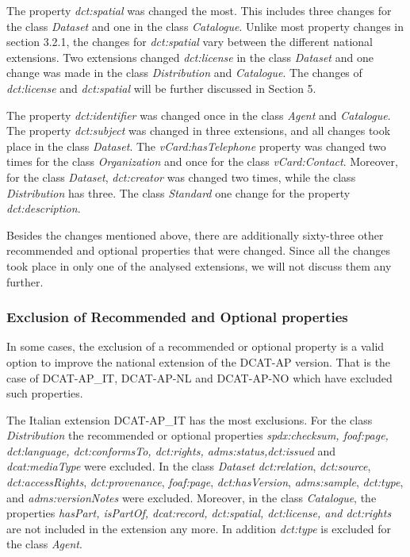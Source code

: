 \documentclass[<options>]{elsarticle}
\begin{document}
The property \textit{dct:spatial} was changed the most. This includes three changes for the class \textit{Dataset} and one in the class \textit{Catalogue}. Unlike most property changes in section 3.2.1, the changes for \textit{dct:spatial} vary between the different national extensions. Two extensions changed \textit{dct:license} in the class \textit{Dataset} and one change was made in the class \textit{Distribution} and \textit{Catalogue}. The changes of \textit{dct:license} and \textit{dct:spatial} will be  further discussed in Section 5. 

The property \textit{dct:identifier} was changed once in the class \textit{Agent} and \textit{Catalogue}. The property \textit{dct:subject} was changed in three extensions, and all changes took place in the class \textit{Dataset}. The \textit{vCard:hasTelephone} property was changed two times for the class \textit{Organization} and once for the class \textit{vCard:Contact}. Moreover, for the class \textit{Dataset}, \textit{dct:creator} was changed two times, while the class \textit{Distribution} has three. The class \textit{Standard} one change for the property \textit{dct:description}.

Besides the changes mentioned above, there are additionally sixty-three other recommended and optional properties that were changed. Since all the changes took place in only one of the analysed extensions, we will not discuss them any further.

\subsubsection{Exclusion of Recommended and Optional properties}

In some cases, the exclusion of a recommended or optional property is a valid option to improve the national extension of the DCAT-AP version. That is the case of DCAT-AP\_IT, DCAT-AP-NL and DCAT-AP-NO which have excluded such properties.

The Italian extension DCAT-AP\_IT has the most exclusions. For the class \textit{Distribution} the recommended or optional properties \textit{spdx:checksum, foaf:page, dct:language, dct:conformsTo, dct:rights, adms:status,dct:issued} and \\ \textit{dcat:mediaType } were excluded. In the class \textit{Dataset} \textit{dct:relation}, \textit{dct:source}, \textit{dct:accessRights}, \textit{dct:provenance}, \textit{foaf:page}, \textit{dct:hasVersion}, \textit{adms:sample}, \textit{dct:type}, and \textit{adms:versionNotes} were excluded. Moreover, in the class \textit{Catalogue}, the properties \textit{hasPart, isPartOf, dcat:record, dct:spatial, dct:license, and dct:rights} are not included in the extension any more. In addition \textit{dct:type} is excluded for the class \textit{Agent}.
\end{document}
